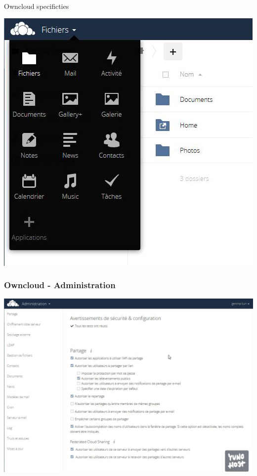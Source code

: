 \documentclass{beamer}
\begin{document}
\begin{frame}
\Huge{\centerline{Owncloud specificties}}
\begin{center}
\includegraphics[scale=0.38] {./Owncloud/OwnCloud_Liste_applications.jpg}
\end{center}
\end{frame}

\begin{frame}
\frametitle{Owncloud - Administration}
\includegraphics[scale=0.3] {./Owncloud/Owncloud_Administration.jpg}
\end{frame}
\end{document}
